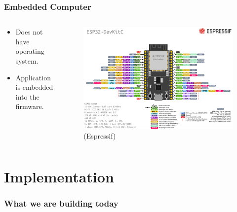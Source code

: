 \documentclass[compress, aspectratio=32]{beamer}
\begin{document}
\begin{frame}
    \frametitle{Embedded Computer}
    \begin{columns}
        \begin{column}[]{0.4\textwidth}
            \begin{itemize}
                \item Does not have operating system.
                \item Application is embedded into the firmware.
            \end{itemize}
        \end{column}
        \begin{column}[]{0.6\textwidth}
            \begin{figure}
                \includegraphics[width=\textwidth]{esp32-devkitC-v4-pinout.png}
                \caption*{(Espressif)}
            \end{figure}
        \end{column}
    \end{columns}
\end{frame}

\section{Implementation}

\begin{frame}
    \frametitle{What we are building today}
\end{frame}
\end{document}
